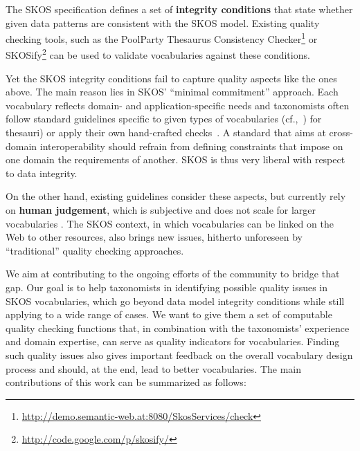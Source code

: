 
The SKOS specification defines a set of \textbf{integrity conditions} that state whether given data patterns are consistent with the SKOS model. Existing quality checking tools, such as the PoolParty Thesaurus Consistency Checker\footnote{\url{http://demo.semantic-web.at:8080/SkosServices/check}} or SKOSify\footnote{\url{http://code.google.com/p/skosify/}} can be used to validate vocabularies against these conditions.

Yet the SKOS integrity conditions fail to capture quality aspects like the ones above. The main reason lies in SKOS' ``minimal commitment'' approach. Each vocabulary reflects domain- and application-specific needs and taxonomists often follow standard guidelines specific to given types of vocabularies (cf.,~\cite{ISO25964-1:2011,Z39.19:2005}) for thesauri) or apply their own hand-crafted checks~\cite{Coronado2009}. A standard that aims at cross-domain interoperability should refrain from defining constraints that impose on one domain the requirements of another. SKOS is thus very liberal with respect to data integrity.

On the other hand, existing guidelines consider these aspects, but currently rely on \textbf{human judgement}, which is subjective and does not scale for larger vocabularies . The SKOS context, in which vocabularies can be linked on the Web to other resources, also brings new issues, hitherto unforeseen by ``traditional'' quality checking approaches.


We aim at contributing to the ongoing efforts of the community to bridge that gap. Our goal is to help taxonomists in identifying possible quality issues in SKOS vocabularies, which go beyond data model integrity conditions while still applying to a wide range of cases. We want to give them a set of computable quality checking functions that, in combination with the taxonomists' experience and domain expertise, can serve as quality indicators for vocabularies. Finding such quality issues also gives important feedback on the overall vocabulary design process and should, at the end, lead to better vocabularies. The main contributions of this work can be summarized as follows:

